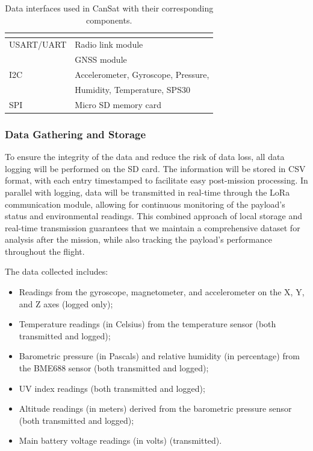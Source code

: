 \begin{table}[ht]
\centering
{}
\begin{tabular}{ll}
\rowcolor{CDOSRPrimary}
\hline
\textbf{\color{white!50}{Data Interface}} & \textbf{\color{white!50}{Components}} \\ \hline
USART/UART & Radio link module \\
& GNSS module \\ 
\rowcolor{CDOSRSecondary!50}I2C & Accelerometer, Gyroscope, Pressure, \\
\rowcolor{CDOSRSecondary!50} &Humidity, Temperature, SPS30 \\
SPI & Micro SD memory card \\ 
\hline
\end{tabular}
\caption{\small{Data interfaces used in CanSat with their corresponding components.}}
\label{tab:data-interfaces}
\end{table}

\subsubsection{Data Gathering and Storage}

To ensure the integrity of the data and reduce the risk of data loss, all data logging will be performed on the SD card. The information will be stored in CSV format, with each entry timestamped to facilitate easy post-mission processing. In parallel with logging, data will be transmitted in real-time through the LoRa communication module, allowing for continuous monitoring of the payload's status and environmental readings. This combined approach of local storage and real-time transmission guarantees that we maintain a comprehensive dataset for analysis after the mission, while also tracking the payload’s performance throughout the flight.

The data collected includes: \begin{itemize} \item Readings from the gyroscope, magnetometer, and accelerometer on the X, Y, and Z axes (logged only); \item Temperature readings (in Celsius) from the temperature sensor (both transmitted and logged); \item Barometric pressure (in Pascals) and relative humidity (in percentage) from the BME688 sensor (both transmitted and logged); \item UV index readings (both transmitted and logged); \item Altitude readings (in meters) derived from the barometric pressure sensor (both transmitted and logged); \item Main battery voltage readings (in volts) (transmitted). \end{itemize}

